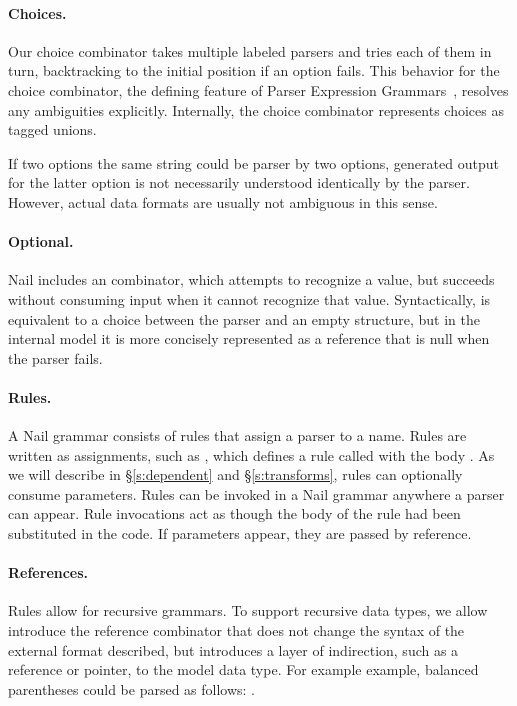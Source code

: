 \paragraph{Choices.}
Our choice combinator takes multiple labeled parsers and tries each of them in turn, backtracking
to the initial position if an option fails. This behavior for the choice combinator, the defining
feature of Parser Expression Grammars~\cite{ford2002packrat}, resolves any ambiguities explicitly.
Internally, the choice combinator represents choices as tagged unions. 

If two options the same string could be parser by two options, generated output for the latter
option is not necessarily understood identically by the parser. However, actual data formats are
usually not ambiguous in this sense.


\paragraph{Optional.}
Nail includes an  combinator, which attempts to recognize a value, but succeeds
without consuming input when it cannot recognize that value. Syntactically,  is
equivalent to a choice between the parser and an empty structure, but in the internal model it is
more concisely represented as a reference that is null when the parser fails.

\paragraph{Rules.}
A Nail grammar consists of rules that assign a parser to a name. Rules are written as
assignments, such as , which defines a rule called  with the
body .  As we will describe in \S\ref{s:dependent}
and \S\ref{s:transforms}, rules can optionally consume parameters. 
Rules can be invoked in a Nail grammar anywhere a parser can appear. Rule invocations act as though
the body of the rule had been substituted in the code. If parameters appear, they are passed by reference.

\paragraph{References.}
Rules allow for recursive grammars. To support recursive data types, we allow introduce the
reference combinator \cc{*}  that does not change the syntax of the external format described, but
introduces a layer of indirection, such as a reference or pointer, to the model data type.
For example example,   balanced parentheses could be parsed as follows: .

